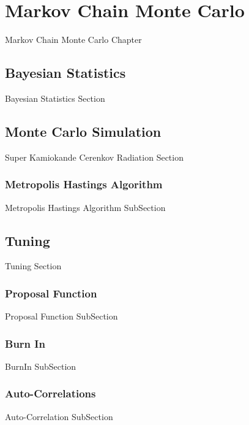 \chapter{Markov Chain Monte Carlo}
\label{chap:MarkovChainMonteCarlo}
Markov Chain Monte Carlo Chapter

\section{Bayesian Statistics}
\label{sec:MarkovChainMonteCarlo_BayesianStatistics}
Bayesian Statistics Section

\section{Monte Carlo Simulation}
\label{sec:MarkovChainMonteCarlo_MonteCarloSimulation}
Super Kamiokande Cerenkov Radiation Section

\subsection{Metropolis Hastings Algorithm}
\label{sec:MarkovChainMonteCarlo_MetropoliseHastingsAlgorithm}
Metropolis Hastings Algorithm SubSection

\section{Tuning}
\label{sec:MarkovChainMonteCarlo_Tuning}
Tuning Section

\subsection{Proposal Function}
\label{sec:MarkovChainMonteCarlo_ProposalFunction}
Proposal Function SubSection

\subsection{Burn In}
\label{sec:MarkovChainMonteCarlo_BurnIn}
BurnIn SubSection

\subsection{Auto-Correlations}
\label{sec:MarkovChainMonteCarlo_AutoCorrelations}
Auto-Correlation SubSection


